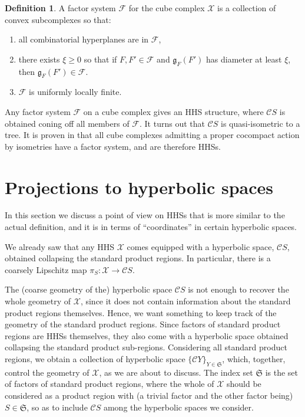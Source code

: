 \documentclass[11pt,oneside]{amsart}
\theoremstyle{definition}
\newtheorem{defn}[thm]{Definition}
\newcommand{\cuco}[1]{{\mathcal #1}}
\newcommand{\fontact}{{\mathcal C}}
\newcommand{\gate}{\mathfrak g}
\begin{document}
\begin{defn}
 A factor system $\mathcal F$ for the cube complex $\cuco X$ is a collection of convex subcomplexes so that:
 \begin{enumerate}
  \item all combinatorial hyperplanes are in $\mathcal F$,
  \item there exists $\xi\geq 0$ so that if $F,F'\in\mathcal F$ and $\gate_{F}(F')$ has diameter at least $\xi$, then $\gate_{F}(F')\in\mathcal F$.
  \item $\mathcal F$ is uniformly locally finite.
 \end{enumerate}
\end{defn}

Any factor system $\mathcal F$ on a cube complex gives an HHS structure, where $\fontact S$ is obtained coning off all members of $\mathcal F$. It turns out that $\fontact S$ is quasi-isometric to a tree. It is proven in \cite{HagenSusse} that all cube complexes admitting a proper cocompact action by isometries have a factor system, and are therefore HHSs.





\section{Projections to hyperbolic spaces}
In this section we discuss a point of view on HHSs that is more similar to the actual definition, and it is in terms of ``coordinates'' in certain hyperbolic spaces.

We already saw that any HHS $\cuco X$ comes equipped with a hyperbolic space, $\fontact S$, obtained collapsing the standard product regions. In particular, there is a coarsely Lipschitz map $\pi_S:\cuco X\to \fontact S$.

The (coarse geometry of the) hyperbolic space $\fontact S$ is not enough to recover the whole geometry of $\cuco X$, since it does not contain information about the standard product regions themselves. Hence, we want something to keep track of the geometry of the standard product regions. Since factors of standard product regions are HHSs themselves, they also come with a hyperbolic space obtained collapsing the standard product sub-regions. Considering all standard product regions, we obtain a collection of hyperbolic space $\{\fontact Y\}_{Y\in\mathfrak S}$, which, together, control the geometry of $\cuco X$, as we are about to discuss. The index set $\mathfrak S$ is the set of factors of standard product regions, where the whole of $\cuco X$ should be considered as a product region with (a trivial factor and the other factor being) $S\in\mathfrak S$, so as to include $\fontact S$ among the hyperbolic spaces we consider.
\end{document}
